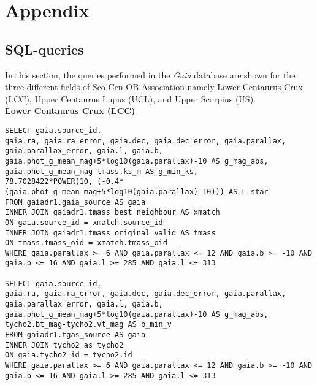 \chapter{ \textbf{Appendix} }\label{ch:Appendix}
\vspace{0.5cm} 

\section{SQL-queries}\label{sec:SQL}
\lstset{language = SQL}

In this section, the queries performed in the \textit{Gaia} database are shown for the three different fields of Sco-Cen OB Association namely Lower Centaurus Crux (LCC), Upper Centaurus Lupus (UCL), and Upper Scorpius (US).\\    

\textbf{Lower Centaurus Crux (LCC)}
\begin{lstlisting}[frame = single]
SELECT gaia.source_id, 
gaia.ra, gaia.ra_error, gaia.dec, gaia.dec_error, gaia.parallax, gaia.parallax_error, gaia.l, gaia.b,
gaia.phot_g_mean_mag+5*log10(gaia.parallax)-10 AS g_mag_abs,
gaia.phot_g_mean_mag-tmass.ks_m AS g_min_ks,
78.7028422*POWER(10, (-0.4*(gaia.phot_g_mean_mag+5*log10(gaia.parallax)-10))) AS L_star
FROM gaiadr1.gaia_source AS gaia
INNER JOIN gaiadr1.tmass_best_neighbour AS xmatch
ON gaia.source_id = xmatch.source_id
INNER JOIN gaiadr1.tmass_original_valid AS tmass
ON tmass.tmass_oid = xmatch.tmass_oid
WHERE gaia.parallax >= 6 AND gaia.parallax <= 12 AND gaia.b >= -10 AND gaia.b <= 16 AND gaia.l >= 285 AND gaia.l <= 313

SELECT gaia.source_id, 
gaia.ra, gaia.ra_error, gaia.dec, gaia.dec_error, gaia.parallax, gaia.parallax_error, gaia.l, gaia.b,
gaia.phot_g_mean_mag+5*log10(gaia.parallax)-10 AS g_mag_abs,
tycho2.bt_mag-tycho2.vt_mag AS b_min_v
FROM gaiadr1.tgas_source AS gaia
INNER JOIN tycho2 as tycho2
ON gaia.tycho2_id = tycho2.id
WHERE gaia.parallax >= 6 AND gaia.parallax <= 12 AND gaia.b >= -10 AND gaia.b <= 16 AND gaia.l >= 285 AND gaia.l <= 313
\end{lstlisting}\vspace{5mm}

